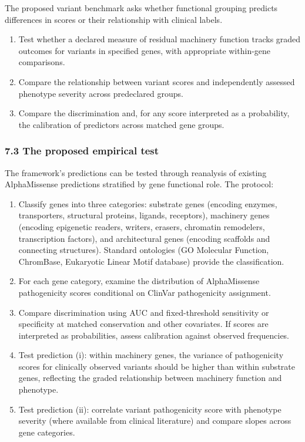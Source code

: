 \documentclass[
]{article}
\begin{document}
The proposed variant benchmark asks whether functional grouping predicts
differences in scores or their relationship with clinical labels.

\begin{enumerate}
\def\labelenumi{(\roman{enumi})}
\item
  Test whether a declared measure of residual machinery function tracks
  graded outcomes for variants in specified genes, with appropriate
  within-gene comparisons.
\item
  Compare the relationship between variant scores and independently
  assessed phenotype severity across predeclared groups.
\item
  Compare the discrimination and, for any score interpreted as a
  probability, the calibration of predictors across matched gene groups.
\end{enumerate}

\hypertarget{the-proposed-empirical-test}{%
\subsubsection{7.3 The proposed empirical
test}\label{the-proposed-empirical-test}}

The framework's predictions can be tested through reanalysis of existing
AlphaMissense predictions stratified by gene functional role. The
protocol:

\begin{enumerate}
\def\labelenumi{\arabic{enumi}.}
\item
  Classify genes into three categories: substrate genes (encoding
  enzymes, transporters, structural proteins, ligands, receptors),
  machinery genes (encoding epigenetic readers, writers, erasers,
  chromatin remodelers, transcription factors), and architectural genes
  (encoding scaffolds and connecting structures). Standard ontologies
  (GO Molecular Function, ChromBase, Eukaryotic Linear Motif database)
  provide the classification.
\item
  For each gene category, examine the distribution of AlphaMissense
  pathogenicity scores conditional on ClinVar pathogenicity assignment.
\item
  Compare discrimination using AUC and fixed-threshold sensitivity or
  specificity at matched conservation and other covariates. If scores
  are interpreted as probabilities, assess calibration against observed
  frequencies.
\item
  Test prediction (i): within machinery genes, the variance of
  pathogenicity scores for clinically observed variants should be higher
  than within substrate genes, reflecting the graded relationship
  between machinery function and phenotype.
\item
  Test prediction (ii): correlate variant pathogenicity score with
  phenotype severity (where available from clinical literature) and
  compare slopes across gene categories.
\end{enumerate}
\end{document}
